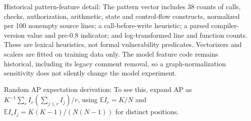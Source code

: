 \documentclass[preprint,12pt]{elsarticle}
\begin{document}
Historical pattern-feature detail: The pattern vector includes 38 counts of calls, checks, authorization, arithmetic, state and control-flow constructs, normalized per 100 nonempty source lines; a call-before-write heuristic; a parsed compiler-version value and pre-0.8 indicator; and log-transformed line and function counts. These are lexical heuristics, not formal vulnerability predicates. Vectorizers and scalers are fitted on training data only. The model feature code remains historical, including its legacy comment removal, so a graph-normalization sensitivity does not silently change the model experiment.

Random AP expectation derivation: To see this, expand AP as \(K^{-1}\sum_r I_r(\sum_{j\le r}I_j)/r\), using \(\mathbb E I_r=K/N\) and \(\mathbb E I_rI_j=K(K-1)/(N(N-1))\) for distinct positions.
\FloatBarrier


\end{document}

